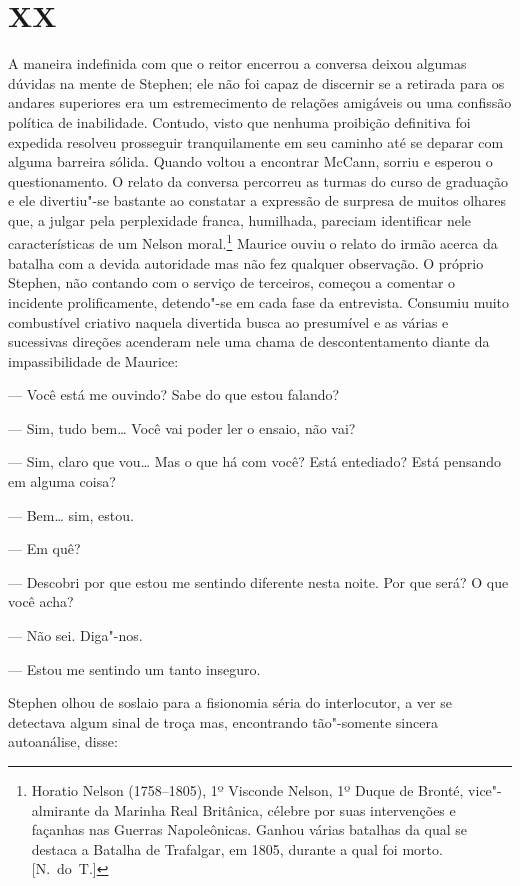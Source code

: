 \section{XX}

A maneira indefinida com que o reitor encerrou a conversa deixou algumas
dúvidas na mente de Stephen; ele não foi capaz de discernir se a retirada para
os andares superiores era um estremecimento de relações amigáveis ou uma
confissão política de inabilidade.  Contudo, visto que nenhuma proibição
definitiva foi expedida resolveu prosseguir tranquilamente em seu caminho até
se deparar com alguma barreira sólida.  Quando voltou a encontrar McCann,
sorriu e esperou o questionamento.  O relato da conversa percorreu as turmas do
curso de graduação e ele divertiu"-se bastante ao constatar a expressão de
surpresa de muitos olhares que, a julgar pela perplexidade franca, humilhada,
pareciam identificar nele características de um Nelson moral.\footnote{ Horatio
Nelson (1758--1805), 1º Visconde Nelson, 1º Duque de Bronté, vice"-almirante da
Marinha Real Britânica, célebre por suas intervenções e façanhas nas Guerras
Napoleônicas. Ganhou várias batalhas da qual se destaca a Batalha de Trafalgar,
em 1805, durante a qual foi morto. [N.~do~T.]} Maurice ouviu o relato do irmão acerca da
batalha com a devida autoridade mas não fez qualquer observação.  O próprio
Stephen, não contando com o serviço de terceiros, começou a comentar o
incidente prolificamente, detendo"-se em cada fase da entrevista.  Consumiu
muito combustível criativo naquela divertida busca ao presumível e as várias e
sucessivas direções acenderam nele uma chama de descontentamento diante da
impassibilidade de Maurice:

--- Você está me ouvindo?  Sabe do que estou falando?

--- Sim, tudo bem\ldots{}  Você vai poder ler o ensaio, não vai?

--- Sim, claro que vou\ldots{}  Mas o que há com você?  Está entediado?  Está
pensando em alguma coisa?

--- Bem\ldots{} sim, estou.

--- Em quê?

--- Descobri por que estou me sentindo diferente nesta noite.  Por que será?  O
que você acha?

--- Não sei.  Diga"-nos.

--- Estou me sentindo um tanto inseguro.

Stephen olhou de soslaio para a fisionomia séria do interlocutor, a ver se
detectava algum sinal de troça mas, encontrando tão"-somente sincera
autoanálise, disse:

